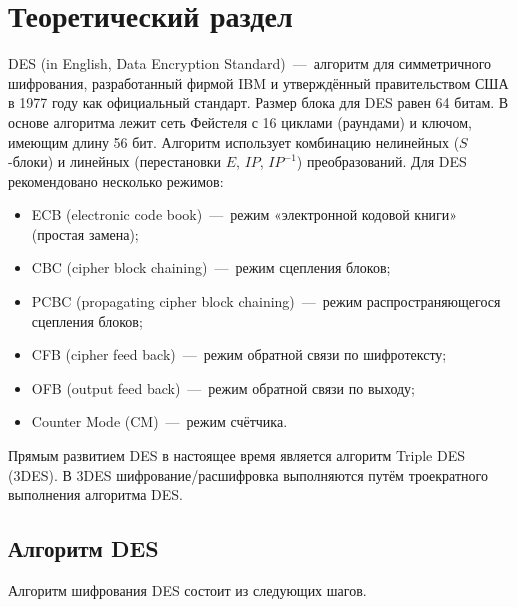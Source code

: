 \chapter{Теоретический раздел}

DES (in English, Data Encryption Standard)~---~алгоритм для симметричного шифрования, разработанный фирмой IBM и утверждённый правительством США в 1977 году как официальный стандарт. Размер блока для DES равен 64 битам. В основе алгоритма лежит сеть Фейстеля с 16 циклами (раундами) и ключом, имеющим длину 56 бит. Алгоритм использует комбинацию нелинейных ($S$-блоки) и линейных (перестановки $E$, $IP$, $IP^{-1}$) преобразований. Для DES рекомендовано несколько режимов:

\begin{itemize}
	\item ECB (electronic code book)~---~режим «электронной кодовой книги» (простая замена);
	\item CBC (cipher block chaining)~---~режим сцепления блоков;
	\item PCBC (propagating cipher block chaining)~---~режим распространяющегося сцепления блоков;
	\item CFB (cipher feed back)~---~режим обратной связи по шифротексту;
	\item OFB (output feed back)~---~режим обратной связи по выходу;
	\item Counter Mode (CM)~---~режим счётчика.
\end{itemize}
     
Прямым развитием DES в настоящее время является алгоритм Triple DES (3DES). В 3DES шифрование/расшифровка выполняются путём троекратного выполнения алгоритма DES. 

\section{Алгоритм DES}

Алгоритм шифрования DES состоит из следующих шагов.

